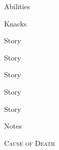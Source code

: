 \documentclass[10pt]{book}
\begin{document}
\medskip

\bigLine

Abilities

\pagebreak

Knacks

\pagebreak

Story \Square
\pagebreak

Story \Square
\pagebreak

Story \Square
\pagebreak

Story \Square
\pagebreak

Story \Square
\pagebreak

Notes
\pagebreak

\null
\pagebreak

\null

\pagebreak

\scshape\large
Cause of Death
\end{document}
